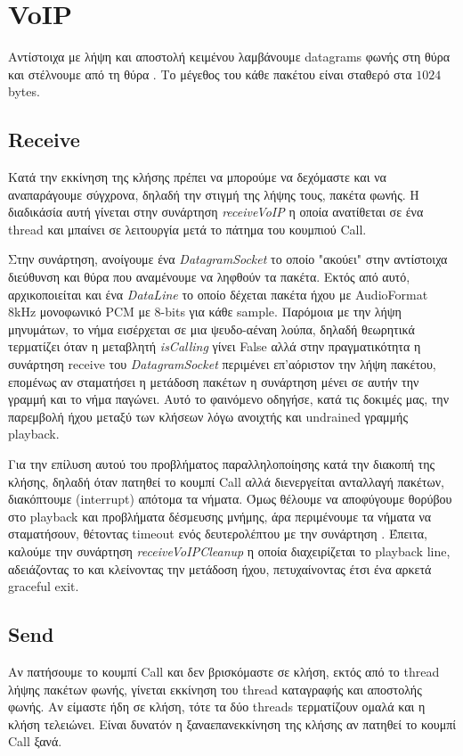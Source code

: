 \documentclass{article}
\begin{document}
\section{VoIP}
Αντίστοιχα με λήψη και αποστολή κειμένου λαμβάνουμε datagrams φωνής στη θύρα \voicedestport{} και 
στέλνουμε από τη θύρα \voicesrcport. Το μέγεθος του κάθε πακέτου είναι σταθερό στα $1024$ bytes.
\subsection{Receive}
Κατά την εκκίνηση της κλήσης πρέπει να μπορούμε να δεχόμαστε και να αναπαράγουμε σύγχρονα, δηλαδή την στιγμή της
λήψης τους, πακέτα φωνής. Η διαδικάσία αυτή γίνεται στην συνάρτηση \textit{receiveVoIP} η οποία ανατίθεται σε ένα
thread και μπαίνει σε λειτουργία μετά το πάτημα του κουμπιού Call. 

Στην συνάρτηση, ανοίγουμε ένα \textit{DatagramSocket} το οποίο "ακούει" στην αντίστοιχα διεύθυνση και θύρα που
αναμένουμε να ληφθούν τα πακέτα. Εκτός από αυτό, αρχικοποιείται και ένα \textit{DataLine} το οποίο δέχεται πακέτα
ήχου με AudioFormat 8kHz μονοφωνικό PCM με 8-bits για κάθε sample. Παρόμοια με την λήψη μηνυμάτων, το νήμα εισέρχεται
σε μια ψευδο-αέναη λούπα, δηλαδή θεωρητικά τερματίζει όταν η μεταβλητή \textit{isCalling} γίνει False αλλά στην
πραγματικότητα η συνάρτηση receive του \textit{DatagramSocket} περιμένει επ'αόριστον την λήψη πακέτου, επομένως
αν σταματήσει η μετάδοση πακέτων η συνάρτηση μένει σε αυτήν την γραμμή και το νήμα παγώνει. Αυτό το φαινόμενο
οδηγήσε, κατά τις δοκιμές μας, την παρεμβολή ήχου μεταξύ των κλήσεων λόγω ανοιχτής και undrained γραμμής playback.

Για την επίλυση αυτού του προβλήματος παραλληλοποίησης κατά την διακοπή της κλήσης, δηλαδή όταν πατηθεί το κουμπί
Call αλλά διενεργείται ανταλλαγή πακέτων, διακόπτουμε (interrupt) απότομα τα νήματα.
Όμως θέλουμε να αποφύγουμε θορύβου στο playback και προβλήματα δέσμευσης μνήμης, άρα περιμένουμε τα νήματα να σταματήσουν,
θέτοντας timeout  ενός δευτερολέπτου με την συνάρτηση . Έπειτα, καλούμε 
την συνάρτηση \textit{receiveVoIPCleanup} η οποία διαχειρίζεται το playback line, αδειάζοντας το και κλείνοντας την 
μετάδοση ήχου, πετυχαίνοντας έτσι ένα αρκετά graceful exit. 

\subsection{Send}
Aν πατήσουμε το κουμπί Call και δεν βρισκόμαστε σε κλήση, 
εκτός από το thread λήψης πακέτων φωνής, γίνεται εκκίνηση του thread καταγραφής και αποστολής φωνής.
Αν είμαστε ήδη σε κλήση, τότε τα δύο threads τερματίζουν ομαλά και η κλήση τελειώνει. Είναι δυνατόν
η ξαναεπανεκκίνηση της κλήσης αν πατηθεί το κουμπί Call ξανά.
\end{document}
